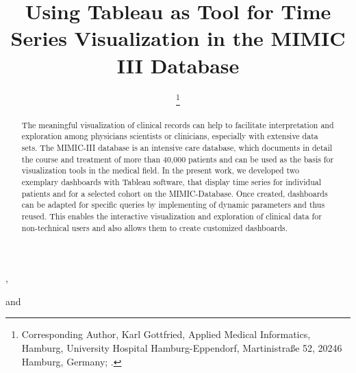 \documentclass[aac]{iosart2x}
\begin{document}
\begin{frontmatter}

{\centering \title{Using Tableau as Tool for Time Series Visualization in the MIMIC III Database 
}}


\author[A]{ %
\thanks{Corresponding Author, Karl Gottfried, Applied Medical Informatics, Hamburg, University Hospital Hamburg-Eppendorf, Martinistraße 52, 20246 Hamburg, Germany;  .}},
\author[A]{ }
and
\author[A]{ }
\address[A]{Applied Medical Informatics, , Germany, ,
}
\address[B]{Department first, ,
Abbreviate US states, }


\begin{abstract}
The meaningful visualization of clinical records can help to facilitate interpretation and exploration among physicians scientists or clinicians, especially with extensive data sets. The MIMIC-III database is an intensive care database, which documents in detail the course and treatment of more than 40,000 patients and can be used as the basis for visualization tools in the medical field. In the present work, we developed two exemplary dashboards with Tableau software, that display time series for individual patients and for a selected cohort on the MIMIC-Database. Once created, dashboards can be adapted for specific queries by implementing of dynamic parameters and thus reused. This enables the interactive visualization and exploration of clinical data for non-technical users and also allows them to create customized dashboards.
\end{abstract}

\begin{keyword}
\end{keyword}

\end{frontmatter}
\end{document}
